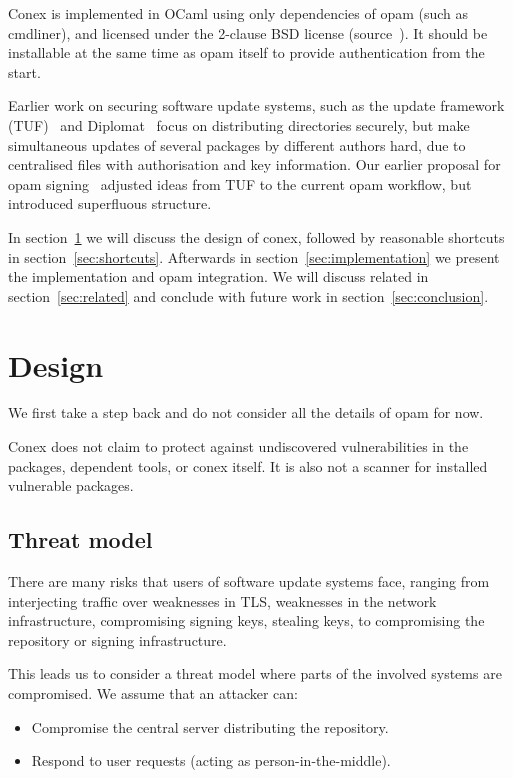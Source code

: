 \documentclass[nocopyrightspace]{sigplanconf}
\begin{document}
Conex is implemented in OCaml using only dependencies of opam (such as cmdliner), and licensed under the 2-clause BSD license (source~\cite{conex}).
It should be installable at the same time as opam itself to provide authentication from the start.

Earlier work on securing software update systems, such as the update framework (TUF)~\cite{tuf} and Diplomat~\cite{diplomat} focus on distributing directories securely, but make simultaneous updates of several packages by different authors hard, due to centralised files with authorisation and key information.
Our earlier proposal for opam signing~\cite{opamsigning} adjusted ideas from TUF to the current opam workflow, but introduced superfluous structure.

In section~\ref{sec:design} we will discuss the design of conex, followed by reasonable shortcuts in section~\ref{sec:shortcuts}.
Afterwards in section~\ref{sec:implementation} we present the implementation and opam integration.
We will discuss related in section~\ref{sec:related} and conclude with future work in section~\ref{sec:conclusion}.

\section{Design} \label{sec:design}
We first take a step back and do not consider all the details of opam for now.

Conex does not claim to protect against undiscovered vulnerabilities in the packages, dependent tools, or conex itself.
It is also not a scanner for installed vulnerable packages.

\subsection{Threat model}
There are many risks that users of software update systems face, ranging from interjecting traffic over weaknesses in TLS, weaknesses in the network infrastructure, compromising signing keys, stealing keys, to compromising the repository or signing infrastructure.

This leads us to consider a threat model where parts of the involved systems are compromised.  We assume that an attacker can:
\begin{itemize}
  \item Compromise the central server distributing the repository.
  \item Respond to user requests (acting as person-in-the-middle).
\end{itemize}
\end{document}
